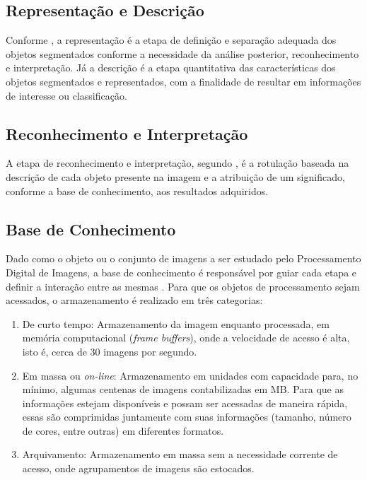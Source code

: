 \documentclass[12pt,oneside,a4paper,chapter=TITLE,section=TITLE,sumario=tradicional]{abntex2}
\begin{document}
\subsection{Representação e Descrição}

Conforme , a representação é a etapa de definição e separação adequada dos objetos segmentados conforme a necessidade da análise posterior, reconhecimento e interpretação. Já a descrição é a etapa quantitativa das características dos objetos segmentados e representados, com a finalidade de resultar em informações de interesse ou classificação.

\subsection{Reconhecimento e Interpretação}

A etapa de reconhecimento e interpretação, segundo , é a rotulação baseada na descrição de cada objeto presente na imagem e a atribuição de um significado, conforme a base de conhecimento, aos resultados adquiridos.

\subsection{Base de Conhecimento}
Dado como o objeto ou o conjunto de imagens a ser estudado pelo Processamento Digital de Imagens, a base de conhecimento é responsável por guiar cada etapa e definir a interação entre as mesmas . Para que os objetos de processamento sejam acessados, o armazenamento é realizado em três categorias:
\begin{enumerate}
    \item De curto tempo: Armazenamento da imagem enquanto processada, em memória computacional (\textit{frame buffers}), onde a velocidade de acesso é alta, isto é, cerca de 30 imagens por segundo.
    \item Em massa ou \textit{on-line}: Armazenamento em unidades com capacidade para, no mínimo, algumas centenas de imagens contabilizadas em MB. Para que as informações estejam disponíveis e possam ser acessadas de maneira rápida, essas são comprimidas juntamente com suas informações (tamanho, número de cores, entre outras) em diferentes formatos.
    \item Arquivamento: Armazenamento em massa sem a necessidade corrente de acesso, onde agrupamentos de imagens são estocados.
\end{enumerate}
\end{document}
